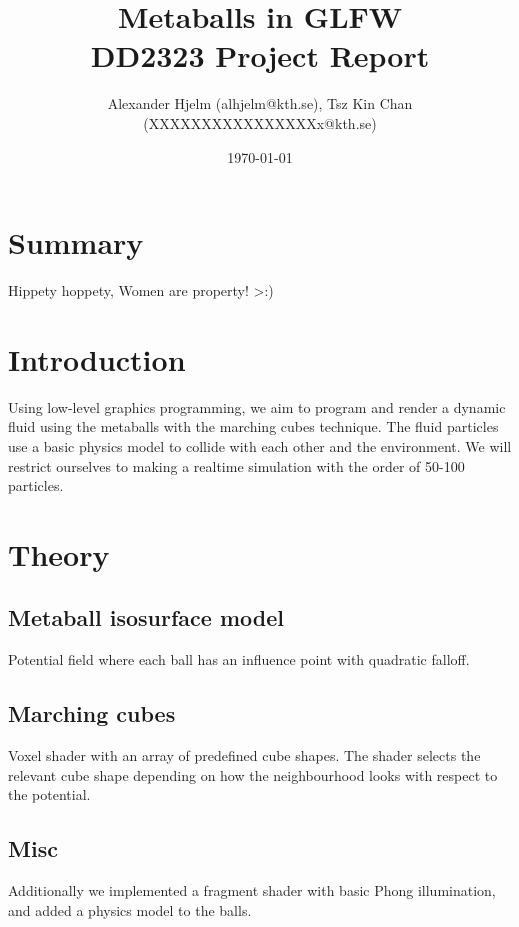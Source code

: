 \documentclass{article}
\begin{document}
    \title{%
      Metaballs in GLFW \\
      \large DD2323 Project Report \\}

    \author{Alexander Hjelm (alhjelm@kth.se), Tsz Kin Chan (XXXXXXXXXXXXXXXXx@kth.se)}

    \date{\today}

    \maketitle


    \section{Summary}
    Hippety hoppety, Women are property! >:)
    
    \section{Introduction}
    
    Using low-level graphics programming, we aim to program and render a dynamic fluid using the metaballs with the marching cubes technique. The fluid particles use a basic physics model to collide with each other and the environment. We will restrict ourselves to making a realtime simulation with the order of 50-100 particles.

    \section{Theory}

        \subsection{Metaball isosurface model}
            Potential field where each ball has an influence point with quadratic falloff.

        \subsection{Marching cubes}
            Voxel shader with an array of predefined cube shapes. The shader selects the relevant cube shape depending on how the neighbourhood looks with respect to the potential.
    
        \subsection{Misc}
            Additionally we implemented a fragment shader with basic Phong illumination, and added a physics model to the balls.
\end{document}
